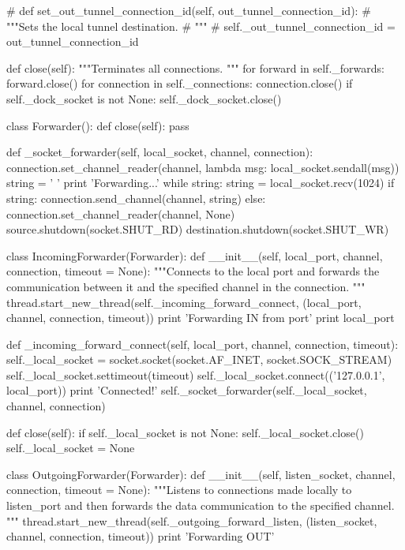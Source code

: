 #     def set_out_tunnel_connection_id(self, out_tunnel_connection_id):
#         """Sets the local tunnel destination.
#         """
#         self._out_tunnel_connection_id = out_tunnel_connection_id

    def close(self):
        """Terminates all connections.
        """
        for forward in self._forwards:
            forward.close()
        for connection in self._connections:
            connection.close()
        if self._dock_socket is not None:
            self._dock_socket.close()

class Forwarder():
    def close(self):
        pass

    def _socket_forwarder(self, local_socket, channel, connection):
        connection.set_channel_reader(channel,
                                      lambda msg:
                                          local_socket.sendall(msg))
        string = ' '
        print 'Forwarding...'
        while string:
            string = local_socket.recv(1024)
            if string:
                connection.send_channel(channel, string)
            else:
                connection.set_channel_reader(channel, None)
                source.shutdown(socket.SHUT_RD)
                destination.shutdown(socket.SHUT_WR)

class IncomingForwarder(Forwarder):
    def __init__(self, local_port, channel, connection, timeout = None):
        """Connects to the local port and forwards the communication between
        it and the specified channel in the connection.
        """
        thread.start_new_thread(self._incoming_forward_connect,
                                (local_port, channel, connection, timeout))
        print 'Forwarding IN from port'
        print local_port

    def _incoming_forward_connect(self, local_port, channel,
                                  connection, timeout):
        self._local_socket = socket.socket(socket.AF_INET, socket.SOCK_STREAM)
        self._local_socket.settimeout(timeout)
        self._local_socket.connect(('127.0.0.1', local_port))
        print 'Connected!'
        self._socket_forwarder(self._local_socket, channel, connection)

    def close(self):
        if self._local_socket is not None:
            self._local_socket.close()
            self._local_socket = None


class OutgoingForwarder(Forwarder):
    def __init__(self, listen_socket, channel, connection, timeout = None):
        """Listens to connections made locally to listen_port and then
        forwards the data communication to the specified channel.
        """
        thread.start_new_thread(self._outgoing_forward_listen,
                                (listen_socket, channel, connection, timeout))
        print 'Forwarding OUT'

